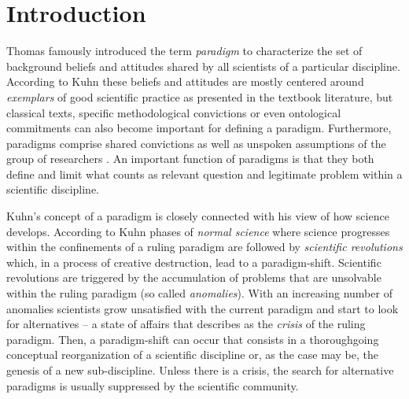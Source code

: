 \documentclass[12pt, a4paper]{article}
\begin{document}
\newpage

\tableofcontents

\onehalfspacing

\section{Introduction}

Thomas \citet{kuhn:1976} famously introduced the term {\em paradigm}
to characterize the set of background beliefs and attitudes shared by
all scientists of a particular discipline. According to Kuhn these
beliefs and attitudes are mostly centered around {\em exemplars} of
good scientific practice as presented in the textbook literature, but
classical texts, specific methodological convictions or even
ontological commitments can also become important for defining a
paradigm. Furthermore, paradigms comprise shared convictions as well
as unspoken assumptions of the group of researchers
\citep[postscript]{kuhn:1976}. An important function of paradigms is
that they both define and limit what counts as relevant question and
legitimate problem within a scientific discipline.

Kuhn's concept of a paradigm is closely connected with his view of how
science develops. According to Kuhn phases of {\em normal science}
where science progresses within the confinements of a ruling paradigm
are followed by {\em scientific revolutions} which, in a process of
creative destruction, lead to a paradigm-shift. Scientific revolutions
are triggered by the accumulation of problems that are unsolvable
within the ruling paradigm (so called {\em anomalies}).  With an
increasing number of anomalies scientists grow unsatisfied with the
current paradigm and start to look for alternatives -- a state of
affairs that \citet[ch. 7/8]{kuhn:1976} describes as the {\em crisis}
of the ruling paradigm. Then, a paradigm-shift can occur that consists
in a thoroughgoing conceptual reorganization of a scientific
discipline or, as the case may be, the genesis of a new
sub-discipline. Unless there is a crisis, the search for alternative
paradigms is usually suppressed by the scientific community.
\end{document}
